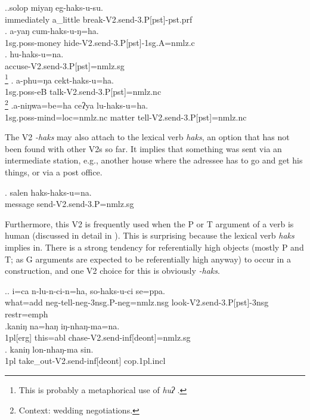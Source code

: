 \ex.\ag.solop miyaŋ eg-haks-u-su.\\
immediately a\_little break{\sc -V2.send-3.P[pst]-pst.prf}\\
 
\bg. a-yaŋ cum-haks-u-ŋ=ha.\\
{\sc 1sg.poss-}money hide{\sc -V2.send-3.P[pst]-1sg.A=nmlz.c}\\
\bg. hu-haks-u=na.\\
accuse{\sc -V2.send-3.P[pst]=nmlz.sg}\\
\footnote{This is probably a metaphorical use of \emph{huʔ} .}
\bg. a-phu=ŋa cekt-haks-u=ha.\\
{\sc 1sg.poss-}eB talk{\sc -V2.send-3.P[pst]=nmlz.nc}\\
\footnote{Context: wedding negotiations.} 
\bg.a-niŋwa=be=ha ceʔya lu-haks-u=ha.\\
{\sc 1sg.poss-}mind{\sc =loc=nmlz.nc} matter tell{\sc -V2.send-3.P[pst]=nmlz.nc}\\


The V2 \emph{-haks} may also attach to the lexical verb \emph{haks}, an option that has not been found with other V2s so far. It implies that something was sent via an intermediate station, e.g., another house where the adressee has to go and get his things, or via a post office. 

\exg. salen haks-haks-u=na.\\
message send{\sc -V2.send-3.P=nmlz.sg}\\


Furthermore, this V2 is frequently used when the P or T argument of a verb is human (discussed in detail in ). This is surprising because the lexical verb \emph{haks}  implies in. There is a strong tendency for referentially high objects (mostly P and T; as G arguments are expected to be referentially high anyway) to occur in a  construction, and one V2 choice for this is obviously \emph{-haks}.

\ex.\ag. i=ca n-lu-n-ci-n=ha, so-haks-u-ci se=ppa.\\
what{\sc =add} {\sc neg-}tell{\sc -neg-3nsg.P-neg=nmlz.nsg}  look{\sc -V2.send-3.P[pst]-3nsg} {\sc restr=emph}\\
 
\bg.kaniŋ na=haŋ    iŋ-nhaŋ-ma=na.\\
{\sc 1pl[erg]} this{\sc =abl} chase{\sc -V2.send-inf[deont]=nmlz.sg}\\
 
\bg. kaniŋ lon-nhaŋ-ma sin.\\
{\sc 1pl} take\_out{\sc -V2.send-inf[deont]} {\sc cop.1pl.incl}\\

